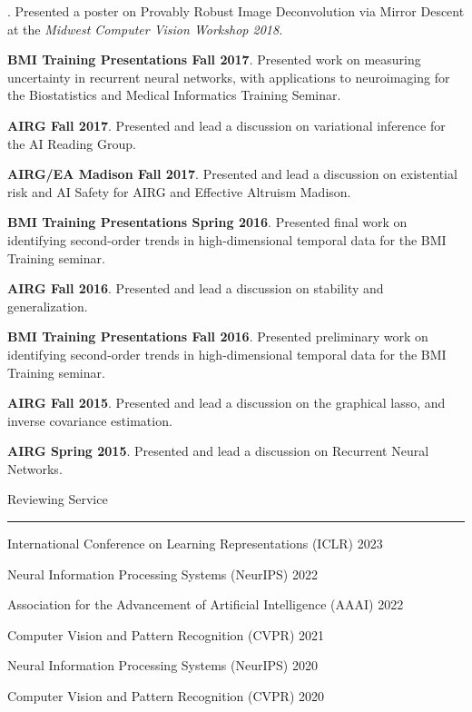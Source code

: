 \documentclass[]{article}
\begin{document}
. Presented a poster on Provably Robust Image Deconvolution via Mirror Descent at the \textit{Midwest Computer Vision Workshop 2018.}

\noindent \textbf{BMI Training Presentations Fall 2017}. Presented work on measuring uncertainty in recurrent neural networks, with applications to neuroimaging for the Biostatistics and Medical Informatics Training Seminar.

\noindent \textbf{AIRG Fall 2017}. Presented and lead a discussion on variational inference for the AI Reading Group.

\noindent \textbf{AIRG/EA Madison Fall 2017}. Presented and lead a discussion on existential risk and AI Safety for AIRG and Effective Altruism Madison.

\noindent \textbf{BMI Training Presentations Spring 2016}. Presented final work on identifying second-order trends in high-dimensional temporal data for the BMI Training seminar.

\noindent \textbf{AIRG Fall 2016}. Presented and lead a discussion on stability and generalization.

\noindent \textbf{BMI Training Presentations Fall 2016}. Presented preliminary work on identifying second-order trends in high-dimensional temporal data for the BMI Training seminar.

\noindent \textbf{AIRG Fall 2015}. Presented and lead a discussion on the graphical lasso, and inverse covariance estimation.

\noindent \textbf{AIRG Spring 2015}. Presented and lead a discussion on Recurrent Neural Networks.

\fi

\iffalse
\vspace{20pt}
{\LARGE Reviewing Service}
\vspace{3pt}
\hrule
\vspace{10pt}

\noindent International Conference on Learning Representations (ICLR) \hfill 2023

\noindent Neural Information Processing Systems (NeurIPS) \hfill 2022

\noindent Association for the Advancement of Artificial Intelligence (AAAI) \hfill 2022

\noindent Computer Vision and Pattern Recognition (CVPR) \hfill 2021

\noindent Neural Information Processing Systems (NeurIPS) \hfill 2020

\noindent Computer Vision and Pattern Recognition (CVPR) \hfill 2020
\end{document}
